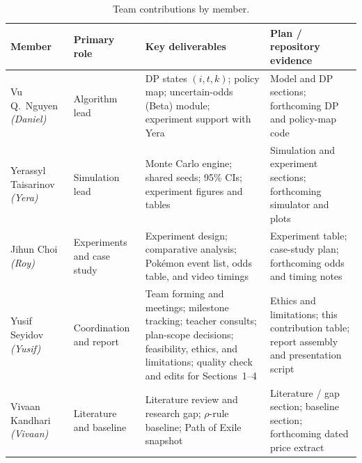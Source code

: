\documentclass[11pt,a4paper]{article}
\begin{document}
\begin{table}[H]
\centering
\caption{Team contributions by member.}
\renewcommand{\arraystretch}{1.18}
\footnotesize
\begin{tabularx}{\textwidth}{@{}
  >{\raggedright\arraybackslash}p{2.35cm}
  >{\raggedright\arraybackslash}p{2.25cm}
  >{\raggedright\arraybackslash}X
  >{\raggedright\arraybackslash}X
@{}}
\toprule
\textbf{Member} & \textbf{Primary role} & \textbf{Key deliverables} & \textbf{Plan / repository evidence} \\
\midrule
Vu Q.\ Nguyen \textit{(Daniel)}
& Algorithm lead
& DP states \((i,t,k)\); policy map; uncertain-odds (Beta) module; experiment support with Yera
& Model and DP sections; forthcoming DP and policy-map code \\
\addlinespace
Yerassyl Taisarinov \textit{(Yera)}
& Simulation lead
& Monte Carlo engine; shared seeds; 95\% CIs; experiment figures and tables
& Simulation and experiment sections; forthcoming simulator and plots \\
\addlinespace
Jihun Choi \textit{(Roy)}
& Experiments and case study
& Experiment design; comparative analysis; Pok\'emon event list, odds table, and video timings
& Experiment table; case-study plan; forthcoming odds and timing notes \\
\addlinespace
Yusif Seyidov \textit{(Yusif)}
& Coordination and report
& Team forming and meetings; milestone tracking; teacher consults; plan-scope decisions; feasibility, ethics, and limitations; quality check and edits for Sections~1--4
& Ethics and limitations; this contribution table; report assembly and presentation script \\
\addlinespace
Vivaan Kandhari \textit{(Vivaan)}
& Literature and baseline
& Literature review and research gap; \(\rho\)-rule baseline; Path of Exile snapshot
& Literature / gap section; baseline section; forthcoming dated price extract \\
\bottomrule
\end{tabularx}
\end{table}
\end{document}
